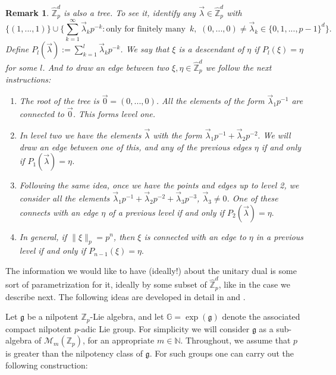 \documentclass[12pt, reqno]{amsart}
\newtheorem{rem}[defi]{Remark}
\newcommand{\N}{\mathbb{N}}
\newcommand{\Z}{\mathbb{Z}}
\newcommand{\1}{\mathds{1}}
\newcommand{\G}{\mathbb{G}}
\newcommand{\g}{\mathfrak{g}}
\begin{document}
\begin{rem}
    $\widehat{\Z}_p^d$ is also a tree. To see it, identify any $\vec{\lambda} \in \widehat{\Z}_p^d$ with \[
\{(1,...,1)\} \cup \Big\{ \sum_{k=1}^{\infty} \vec{\lambda}_k p^{-k} : \text{only for finitely many } \, k, \, \,  (0,...,0) \neq  \vec{\lambda}_k \in \{0,1,...,p-1 \}^d  \Big\}.
\]Define $P_l (\vec{\lambda}) := \sum_{k=1}^l \vec{\lambda}_k p^{-k}$. We say that $\xi$ is a descendant of $\eta$ if $P_l(\xi) = \eta$ for some $l$. And to draw an edge between two $\xi, \eta \in \widehat{\Z}_p^d$ we follow the next instructions: 
\begin{enumerate}
    \item The root of the tree is $\vec{0}=(0,...,0)$. All the elements of the form $ \vec{\lambda}_1 p^{-1}$ are connected to $\vec{0}$. This forms level one. 
    \item In level two we have the elements $\vec{\lambda}$ with the form $\vec{\lambda}_1 p^{-1} + \vec{\lambda}_2 p^{-2}.$ We will draw an edge between one of this, and any of the previous edges $\eta$ if and only if $P_1( \vec{\lambda}) = \eta$. 
    \item Following the same idea, once we have the points and edges up to level 2, we consider all the elements $\vec{\lambda}_1 p^{-1} + \vec{\lambda}_2 p^{-2}+ \vec{\lambda}_3 p^{-3}$, $\vec{\lambda}_3 \neq 0$. One of these connects with an edge $\eta$ of a previous level if and only if $P_2 (\vec{\lambda}) = \eta.$
    \item In general, if $\|  \xi \|_p = p^n$, then $\xi$ is connected with an edge to $\eta$ in a previous level if and only if $P_{n-1} (\xi) = \eta .$
\end{enumerate}
\end{rem}




The information we would like to have (ideally!) about the unitary dual is some sort of parametrization for it, ideally by some subset of $\widehat{\Z}_p^d$, like in the case we describe next. The following ideas are developed in detail in \cite{Boyarchenko2008} and \cite{Howe1977}. 

Let $\mathfrak{g}$ be a nilpotent $\Z_p$-Lie algebra, and let $\G = \exp(\mathfrak{g})$ denote the associated compact nilpotent $p$-adic Lie group. For simplicity we will consider $\g$ as a sub-algebra of $\mathcal{M}_{m} (\Z_p)$, for an appropriate $m \in \N$. Throughout, we assume that $p$ is greater than the nilpotency class of $\g$. For such groups one can carry out the following construction:
\end{document}

